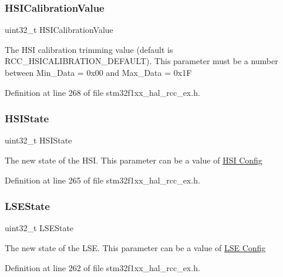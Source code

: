\subsubsection{\texorpdfstring{H\+S\+I\+Calibration\+Value}{HSICalibrationValue}}
{\footnotesize\ttfamily uint32\+\_\+t H\+S\+I\+Calibration\+Value}

The H\+SI calibration trimming value (default is R\+C\+C\+\_\+\+H\+S\+I\+C\+A\+L\+I\+B\+R\+A\+T\+I\+O\+N\+\_\+\+D\+E\+F\+A\+U\+LT). This parameter must be a number between Min\+\_\+\+Data = 0x00 and Max\+\_\+\+Data = 0x1F 

Definition at line 268 of file stm32f1xx\+\_\+hal\+\_\+rcc\+\_\+ex.\+h.

\mbox{\label{struct_r_c_c___osc_init_type_def_a49183e0be5cf522de0fa1968df0bf0d7}} 
\subsubsection{\texorpdfstring{H\+S\+I\+State}{HSIState}}
{\footnotesize\ttfamily uint32\+\_\+t H\+S\+I\+State}

The new state of the H\+SI. This parameter can be a value of \hyperlink{group___r_c_c___h_s_i___config}{H\+SI Config} 

Definition at line 265 of file stm32f1xx\+\_\+hal\+\_\+rcc\+\_\+ex.\+h.

\mbox{\label{struct_r_c_c___osc_init_type_def_abb72dd5bfb99667e36d99b6887f80a0a}} 
\subsubsection{\texorpdfstring{L\+S\+E\+State}{LSEState}}
{\footnotesize\ttfamily uint32\+\_\+t L\+S\+E\+State}

The new state of the L\+SE. This parameter can be a value of \hyperlink{group___r_c_c___l_s_e___config}{L\+SE Config} 

Definition at line 262 of file stm32f1xx\+\_\+hal\+\_\+rcc\+\_\+ex.\+h.

